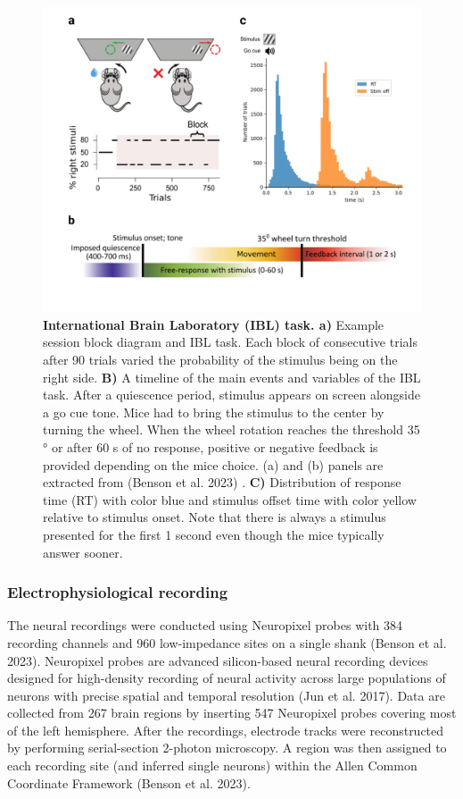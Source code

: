 \documentclass[
  letterpaper,
  DIV=11,
  numbers=noendperiod]{scrartcl}
\begin{document}
\begin{figure}

{\centering \includegraphics[width=6.46875in,height=\textheight]{images/task.png}

}

\caption{\textbf{International Brain Laboratory (IBL) task. a)} Example
session block diagram and IBL task. Each block of consecutive trials
after 90 trials varied the probability of the stimulus being on the
right side. \textbf{B)} A timeline of the main events and variables of
the IBL task. After a quiescence period, stimulus appears on screen
alongside a go cue tone. Mice had to bring the stimulus to the center by
turning the wheel. When the wheel rotation reaches the threshold 35 ° or
after 60 s of no response, positive or negative feedback is provided
depending on the mice choice. (a) and (b) panels are extracted from
(Benson et al. 2023) . \textbf{C)} Distribution of response time (RT)
with color blue and stimulus offset time with color yellow relative to
stimulus onset. Note that there is always a stimulus presented for the
first 1 second even though the mice typically answer sooner.~}

\end{figure}%

\subsubsection{Electrophysiological
recording}\label{electrophysiological-recording}

The neural recordings were conducted using Neuropixel probes with 384
recording channels and 960 low-impedance sites on a single shank (Benson
et al. 2023). Neuropixel probes are advanced silicon-based neural
recording devices designed for high-density recording of neural activity
across large populations of neurons with precise spatial and temporal
resolution (Jun et al. 2017). Data are collected from 267 brain regions
by inserting 547 Neuropixel probes covering most of the left hemisphere.
After the recordings, electrode tracks were reconstructed by performing
serial-section 2-photon microscopy. A region was then assigned to each
recording site (and inferred single neurons) within the Allen Common
Coordinate Framework (Benson et al. 2023).
\end{document}
